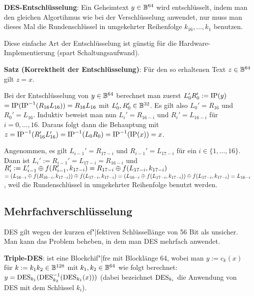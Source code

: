 \linie

\textbf{DES-Entschlüsselung}:
Ein Geheimtext $y \in \mathbb{B}^{64}$ wird entschlüsselt,
indem man den gleichen Algortihmus wie bei der Verschlüsselung anwendet,
nur muss man dieses Mal die Rundenschlüssel in umgekehrter Reihenfolge $k_{16}, \dotsc, k_1$
benutzen.

Diese einfache Art der Entschlüsselung ist günstig für die Hardware-Implementierung
(spart Schaltungsaufwand).

\textbf{Satz (Korrektheit der Entschlüsselung)}:
Für den so erhaltenen Text $z \in \mathbb{B}^{64}$ gilt $z = x$.

\begin{Beweis}
    Bei der Entschlüsselung von $y \in \mathbb{B}^{64}$ berechnet man zuerst
    $L_0' R_0' := \operatorname{IP}(y)$\\
    $= \operatorname{IP}(\operatorname{IP}^{-1}(R_{16} L_{16})) = R_{16} L_{16}$ mit
    $L_0', R_0' \in \mathbb{B}^{32}$.
    Es gilt also $L_0' = R_{16}$ und $R_0' = L_{16}$.
    Induktiv beweist man nun $L_i' = R_{16-i}$ und $R_i' = L_{16-i}$ für $i = 0, \dotsc, 16$.
    Daraus folgt dann die Behauptung mit
    $z = \operatorname{IP}^{-1}(R_{16}' L_{16}') = \operatorname{IP}^{-1}(L_0 R_0) = \operatorname{IP}^{-1}(\operatorname{IP}(x)) = x$.
    
    Angenommen, es gilt $L_{i-1}' = R_{17-i}$ und $R_{i-1}' = L_{17-i}$ für ein
    $i \in \{1, \dotsc, 16\}$.\\
    Dann ist $L_i' := R_{i-1}' = L_{17-i} = R_{16-i}$ und
    $R_i' := L_{i-1}' \oplus f(R_{i-1}', k_{17-i}) =
    R_{17-i} \oplus f(L_{17-i}, k_{17-i})$\\
    $= (L_{16-i} \oplus f(R_{16-i}, k_{17-i})) \oplus f(L_{17-i}, k_{17-i})
    = (L_{16-i} \oplus f(L_{17-i}, k_{17-i})) \oplus f(L_{17-i}, k_{17-i}) = L_{16-i}$,
    weil die Rundenschlüssel in umgekehrter Reihenfolge benutzt werden.
\end{Beweis}

\pagebreak

\subsection{%
    Mehrfachverschlüsselung%
}

DES gilt wegen der kurzen ef"|fektiven Schlüssellänge von 56 Bit als unsicher.
Man kann das Problem beheben, in dem man DES mehrfach anwendet.

\textbf{Triple-DES}:
 ist eine Blockchif"|fre mit Blocklänge 64, wobei man
$y := c_k(x)$ für $k := k_1 k_2 \in \mathbb{B}^{128}$ mit $k_1, k_2 \in \mathbb{B}^{64}$ wie folgt berechnet:
$y = \operatorname{DES}_{k_1}(\operatorname{DES}^{-1}_{k_2}(\operatorname{DES}_{k_1}(x)))$
(dabei bezeichnet $\operatorname{DES}_{k_i}$ die Anwendung von DES mit dem Schlüssel $k_i$).

